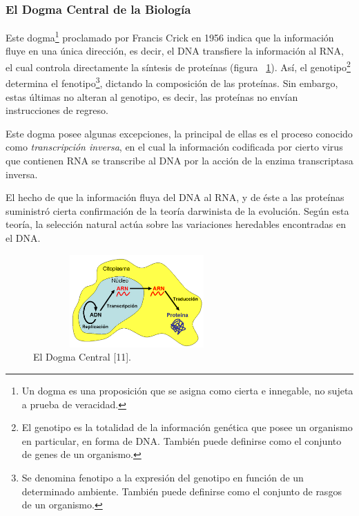 \subsubsection{El Dogma Central de la Biología}
\par Este dogma\footnote{Un dogma es una proposición que se asigna como cierta e innegable, no sujeta a prueba de veracidad.} proclamado por Francis Crick en 1956 indica que la información fluye en una única dirección, es decir, el DNA transfiere la información al RNA, el cual controla directamente la síntesis de proteínas (figura ~\ref{dogma}). Así, el genotipo\footnote{El genotipo es la totalidad de la información genética que posee un organismo en particular, en forma de DNA. También puede definirse como el conjunto de genes de un organismo.} determina el fenotipo\footnote{Se denomina fenotipo a la expresión del genotipo en función de un determinado ambiente. También puede definirse como el conjunto de rasgos de un organismo.}, dictando la composición de las proteínas. Sin embargo, estas últimas no alteran al genotipo, es decir, las proteínas no envían instrucciones de regreso. 
\par Este dogma posee algunas excepciones, la principal de ellas es el proceso conocido como \textit{transcripción inversa}, en el cual la información codificada por cierto virus que contienen RNA se transcribe al DNA por la acción de la enzima transcriptasa inversa. 
\par El hecho de que la información fluya del DNA al RNA, y de éste a las proteínas suministró cierta confirmación de la teoría darwinista de la evolución. Según esta teoría, la selección natural actúa sobre las variaciones heredables encontradas en el DNA\cite{curtis}.

\begin{figure} [h]
	\hspace*{3cm}\includegraphics[width=3.1209in,height=1.4000in]{image/rel.png} 
	\caption{El Dogma Central [11].}	
	\label{dogma}
\end{figure}				

